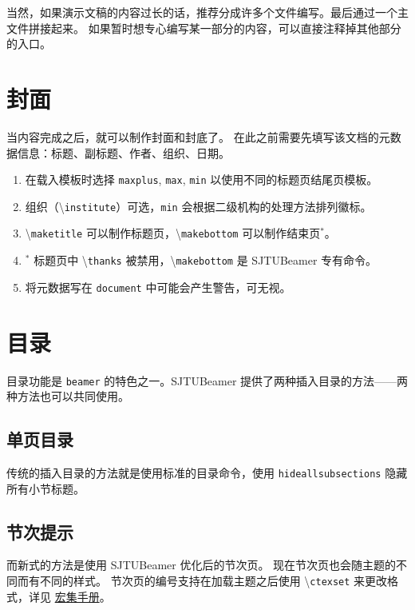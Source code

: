 \documentclass[
    UTF8,
    heading=true,
    12pt,
    a4paper
]{ctexrep}
\newenvironment{commentlist}
{\begin{enumerate}\small}
{\end{enumerate}}
\newcommand{\cmd}[1]{\textbackslash{}\texttt{#1}}
\newcommand{\cls}[1]{\texttt{#1}}
\newcommand{\env}[1]{\texttt{#1}}
\newcommand{\opt}[1]{\texttt{#1}}
\def\themename{\textsf{SJTUBeamer}}
\begin{document}
\clearpage

当然，如果演示文稿的内容过长的话，推荐分成许多个文件编写。最后通过一个主文件拼接起来。
如果暂时想专心编写某一部分的内容，可以直接注释掉其他部分的入口。


\chapter{封面}

当内容完成之后，就可以制作封面和封底了。
在此之前需要先填写该文档的元数据信息：标题、副标题、作者、组织、日期。


\begin{commentlist}
  \item 在载入模板时选择 \opt{maxplus}, \opt{max},
  \opt{min} 以使用不同的标题页结尾页模板。
  \item 组织（\cmd{institute}）可选，\opt{min}
  会根据二级机构的处理方法排列徽标。
  \item \cmd{maketitle} 可以制作标题页，\cmd{makebottom}
  可以制作结束页$^*$。
  \item$^*$ 标题页中 \cmd{thanks}
  被禁用，\cmd{makebottom} 是 \themename{} 专有命令。
  \item[\faExclamationTriangle] 将元数据写在
  \env{document} 中可能会产生警告，可无视。
\end{commentlist}

\chapter{目录}

目录功能是 \cls{beamer} 的特色之一。\themename{}
提供了两种插入目录的方法——两种方法也可以共同使用。

\section{单页目录}

传统的插入目录的方法就是使用标准的目录命令，使用 \opt{hideallsubsections}
隐藏所有小节标题。


\section{节次提示}

而新式的方法是使用 \themename{} 优化后的节次页。
现在节次页也会随主题的不同而有不同的样式。
节次页的编号支持在加载主题之后使用
\cmd{ctexset} 来更改格式，详见
\href{https://mirrors.sjtug.sjtu.edu.cn/CTAN/language/chinese/ctex/ctex.pdf#7}{\CTeX{} 宏集手册}。
\end{document}
